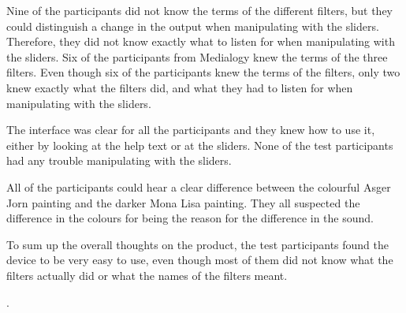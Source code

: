Nine of the participants did not know the terms of the different filters, but they could distinguish a change in the output when manipulating with the sliders. Therefore, they did not know exactly what to listen for when manipulating with the sliders. Six of the participants from Medialogy knew the terms of the three filters. Even though six of the participants knew the terms of the filters, only two knew exactly what the filters did, and what they had to listen for when manipulating with the sliders. 

The interface was clear for all the participants and they knew how to use it, either by looking at the help text or at the sliders. None of the test participants had any trouble manipulating with the sliders. 

All of the participants could hear a clear difference between the colourful Asger Jorn painting and the darker Mona Lisa painting. They all suspected the difference in the colours for being the reason for the difference in the sound. 

To sum up the overall thoughts on the product, the test participants found the device to be very easy to use, even though most of them did not know what the filters actually did or what the names of the filters meant. 

. 